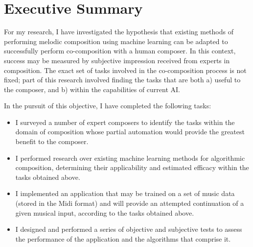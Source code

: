 \documentclass[ author={Stephen Livermore-Tozer},
				supervisor={Dr. Peter Flach},
				degree={MEng},
				title={Performing Algorithmic Co-composition Using Machine Learning},
				subtitle={},
				type={research},
				year={2016} ]{dissertation}
\begin{document}
	
	\maketitle
	
	\frontmatter
	
	\makedecl
	
	\tableofcontents
	\listoffigures
	\listoftables
	\listofalgorithms
	\lstlistoflistings
	
	
	\chapter*{Executive Summary}
	
	For my research, I have investigated the hypothesis that existing methods of performing melodic composition using machine learning can be adapted to successfully perform co-composition with a human composer. In this context, success may be measured by subjective impression received from experts in composition. The exact set of tasks involved in the co-composition process is not fixed; part of this research involved finding the tasks that are both a) useful to the composer, and b) within the capabilities of current AI.
	
	In the pursuit of this objective, I have completed the following tasks:
	\begin{itemize}
		\item I surveyed a number of expert composers to identify the tasks within the domain of composition whose partial automation would provide the greatest benefit to the composer.
		\item I performed research over existing machine learning methods for algorithmic composition, determining their applicability and estimated efficacy within the tasks obtained above.
		\item I implemented an application that may be trained on a set of music data (stored in the Midi format) and will provide an attempted continuation of a given musical input, according to the tasks obtained above.
		\item I designed and performed a series of objective and subjective tests to assess the performance of the application and the algorithms that comprise it.
	\end{itemize}
	
	
	
\end{document}
